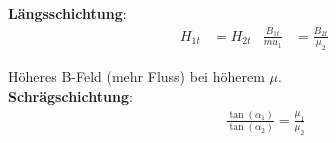 \textbf{Längsschichtung}:
\begin{align*}
	H_{1t} &= H_{2t} &  \frac{B_{1t}}{mu_1} &= \frac{B_{2t}}{\mu_2}&
\end{align*}

Höheres B-Feld (mehr Fluss) bei höherem $ \mu $.\\

\textbf{Schrägschichtung}:
\begin{align*}
	&\frac{\tan( \alpha_1)}{\tan( \alpha_2)} = \frac{ \mu_1}{\mu_2}
\end{align*}
